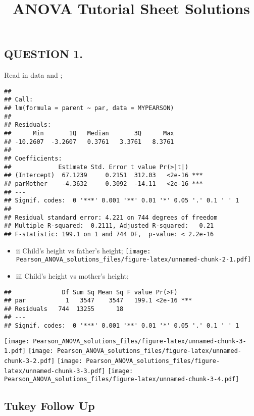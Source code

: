 \documentclass[
]{article}
\title{ANOVA Tutorial Sheet Solutions}
\author{}
\date{\vspace{-2.5em}}
\begin{document}
\maketitle

\hypertarget{question-1.}{%
\subsection{QUESTION 1.}\label{question-1.}}

Read in data and ;

\begin{verbatim}
## 
## Call:
## lm(formula = parent ~ par, data = MYPEARSON)
## 
## Residuals:
##      Min       1Q   Median       3Q      Max 
## -10.2607  -3.2607   0.3761   3.3761   8.3761 
## 
## Coefficients:
##             Estimate Std. Error t value Pr(>|t|)    
## (Intercept)  67.1239     0.2151  312.03   <2e-16 ***
## parMother    -4.3632     0.3092  -14.11   <2e-16 ***
## ---
## Signif. codes:  0 '***' 0.001 '**' 0.01 '*' 0.05 '.' 0.1 ' ' 1
## 
## Residual standard error: 4.221 on 744 degrees of freedom
## Multiple R-squared:  0.2111, Adjusted R-squared:   0.21 
## F-statistic: 199.1 on 1 and 744 DF,  p-value: < 2.2e-16
\end{verbatim}

\begin{itemize}
\item
  ii Child's height vs father's height;
  \texttt{[image: Pearson\_ANOVA\_solutions\_files/figure-latex/unnamed-chunk-2-1.pdf]}
\item
  iii Child's height vs mother's height;
\end{itemize}

\begin{verbatim}
##              Df Sum Sq Mean Sq F value Pr(>F)    
## par           1   3547    3547   199.1 <2e-16 ***
## Residuals   744  13255      18                   
## ---
## Signif. codes:  0 '***' 0.001 '**' 0.01 '*' 0.05 '.' 0.1 ' ' 1
\end{verbatim}

\texttt{[image: Pearson\_ANOVA\_solutions\_files/figure-latex/unnamed-chunk-3-1.pdf]}
\texttt{[image: Pearson\_ANOVA\_solutions\_files/figure-latex/unnamed-chunk-3-2.pdf]}
\texttt{[image: Pearson\_ANOVA\_solutions\_files/figure-latex/unnamed-chunk-3-3.pdf]}
\texttt{[image: Pearson\_ANOVA\_solutions\_files/figure-latex/unnamed-chunk-3-4.pdf]}

\hypertarget{tukey-follow-up}{%
\subsection{Tukey Follow Up}\label{tukey-follow-up}}
\end{document}
